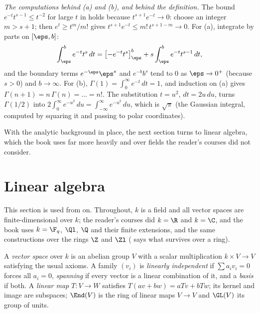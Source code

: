 \emph{The computations behind (a) and (b), and behind the definition.} The bound
$e^{-t}t^{s-1}\le t^{-2}$ for large $t$ in  holds because
$t^{s+1}e^{-t}\to0$: choose an integer $m>s+1$; then $e^t\ge t^m/m!$ gives
$t^{s+1}e^{-t}\le m!\,t^{s+1-m}\to0$. For (a), integrate by parts on $[\eps,b]$:
\[
\int_\eps^be^{-t}t^s\,dt=\bigl[-e^{-t}t^s\bigr]_\eps^b+s\int_\eps^be^{-t}t^{s-1}\,dt,
\]
and the boundary terms $e^{-\eps}\eps^s$ and $e^{-b}b^s$ tend to $0$ as $\eps\to0^+$ (because $s>0$)
and $b\to\infty$. For (b), $\Gamma(1)=\int_0^\infty e^{-t}\,dt=1$, and induction on (a) gives
$\Gamma(n+1)=n\,\Gamma(n)=\dots=n!$. The substitution $t=u^2$, $dt=2u\,du$, turns $\Gamma(1/2)$ into
$2\int_0^\infty e^{-u^2}\,du=\int_{-\infty}^\infty e^{-u^2}\,du$, which is $\sqrt\pi$ (the
Gaussian integral, computed by squaring it and passing to polar coordinates).

With the analytic background in place, the next section turns to linear algebra, which the book
uses far more heavily and over fields the reader's courses did not consider.

\section{Linear algebra}\label{sec:prereq:linear}

This section is used from  on. Throughout, $k$ is a field and all vector spaces are
finite-dimensional over $k$; the reader's courses did $k=\R$ and $k=\C$, and the book uses
$k=\F_q$, $\Ql$, $\Q$ and their finite extensions, and the same constructions over the rings $\Z$
and $\Zl$ ( says what survives over a ring).

\begin{definition}\label{def:prereq:vs}
A \emph{vector space} over $k$ is an abelian group $V$ with a scalar multiplication $k\times V\to V$
satisfying the usual axioms. A family $(v_i)$ is \emph{linearly independent} if
$\sum a_iv_i=0$ forces all $a_i=0$, \emph{spanning} if every vector is a linear combination of it,
and a \emph{basis} if both. A \emph{linear map} $T\colon V\to W$ satisfies $T(av+bw)=aTv+bTw$; its
kernel and image are subspaces; $\End(V)$ is the ring of linear maps $V\to V$ and $\GL(V)$ its
group of units.
\end{definition}

